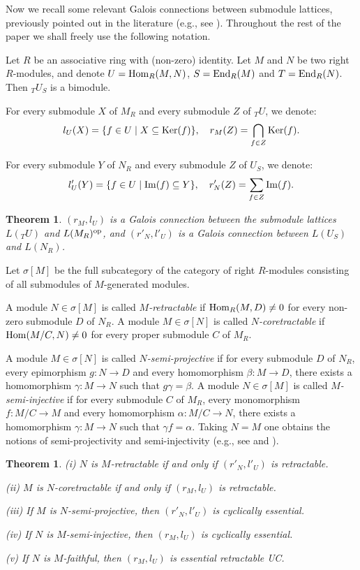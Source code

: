 \documentclass[11pt,a4paper]{amsart}
\newtheorem{thm}[theorem]{Theorem}
\begin{document}
Now we recall some relevant Galois connections between submodule lattices, previously pointed out in the
literature (e.g., see \cite{AN}). Throughout the rest of the paper we shall freely use the following notation. 

Let $R$ be an associative ring with (non-zero) identity. Let $M$ and $N$ be two right $R$-modules, and denote
$U={{\rm Hom}}_R(M,N)$, $S={{\rm End}}_R(M)$ and $T={{\rm End}}_R(N)$. Then $_TU_S$ is a bimodule. 

For every submodule $X$ of $M_R$ and every submodule $Z$ of ${}_TU$, we denote: 
\[l_U(X)=\{f\in U\mid X\subseteq {\rm Ker}(f)\}, \quad r_M(Z)=\bigcap_{f\in Z}{\rm Ker}(f).\]

For every submodule $Y$ of $N_R$ and every submodule $Z$ of $U_S$, we denote: 
\[l'_U(Y)=\{f\in U\mid {\rm Im}(f)\subseteq Y\}, \quad r'_N(Z)=\sum_{f\in Z}{\rm Im}(f).\]

\begin{thm} {\rm \cite[Proposition~3.4]{AN}} $(r_M,l_U)$ is a Galois connection between the submodule lattices
$L({}_TU)$ and $L(M_R)^{\rm op}$, and $(r'_N,l'_U)$ is a Galois connection between $L(U_S)$ and $L(N_R)$.  
\end{thm}

Let $\sigma[M]$ be the full subcategory of the category of right $R$-modules consisting of all submodules of
$M$-generated modules. 

A module $N\in \sigma[M]$ is called \emph{$M$-retractable} if ${{\rm Hom}}_R(M,D)\neq 0$ for every non-zero submodule $D$ of
$N_R$. A module $M\in \sigma[N]$ is called \emph{$N$-coretractable} if ${{\rm Hom}}(M/C,N)\neq 0$ for every proper submodule
$C$ of $M_R$. 

A module $M\in \sigma[N]$ is called \emph{$N$-semi-projective} if for every submodule $D$ of $N_R$, every epimorphism
$g:N\to D$ and every homomorphism $\beta:M\to D$, there exists a homomorphism $\gamma:M\to N$ such that
$g\gamma=\beta$. A module $N\in \sigma[M]$ is called \emph{$M$-semi-injective} if for every submodule $C$ of $M_R$,
every monomorphism $f:M/C\to M$ and every homomorphism $\alpha:M/C\to N$, there exists a homomorphism $\gamma:M\to N$
such that $\gamma f=\alpha$. Taking $N=M$ one obtains the notions of semi-projectivity and semi-injectivity (e.g., see
\cite[4.20]{CLVW} and \cite[p. 261]{Wis}).

\begin{thm} \label{t:retcoret} (i) $N$ is $M$-retractable if and only if $(r'_N,l'_U)$ is retractable.

(ii) $M$ is $N$-coretractable if and only if $(r_M,l_U)$ is retractable.

(iii) If $M$ is $N$-semi-projective, then $(r'_N,l'_U)$ is cyclically essential.  

(iv) If $N$ is $M$-semi-injective, then $(r_M,l_U)$ is cyclically essential.  

(v) If $N$ is $M$-faithful, then $(r_M,l_U)$ is essential retractable UC. 
\end{thm}
\end{document}
